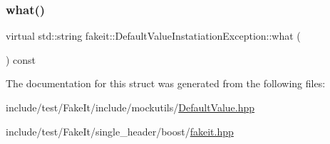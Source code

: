 \mbox{\label{structfakeit_1_1DefaultValueInstatiationException_a64d51af8601b672a5300c38a91b0b44d}} 
\subsubsection{\texorpdfstring{what()}{what()}\hspace{0.1cm}{\footnotesize\ttfamily [9/9]}}
{\footnotesize\ttfamily virtual std\+::string fakeit\+::\+Default\+Value\+Instatiation\+Exception\+::what (\begin{DoxyParamCaption}{ }\end{DoxyParamCaption}) const\hspace{0.3cm}{\ttfamily [pure virtual]}}



The documentation for this struct was generated from the following files\+:\begin{DoxyCompactItemize}
\item 
include/test/\+Fake\+It/include/mockutils/\mbox{\hyperlink{DefaultValue_8hpp}{Default\+Value.\+hpp}}\item 
include/test/\+Fake\+It/single\+\_\+header/boost/\mbox{\hyperlink{single__header_2boost_2fakeit_8hpp}{fakeit.\+hpp}}\end{DoxyCompactItemize}
